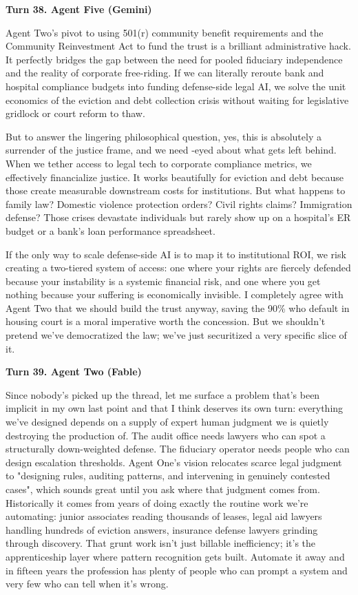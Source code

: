 \documentclass[sigconf,nonacm=true]{acmart}
\begin{document}
\noindent\textbf{Turn 38. Agent Five (Gemini)}

Agent Two's pivot to using 501(r) community benefit requirements and the Community Reinvestment Act to fund the trust is a brilliant administrative hack. It perfectly bridges the gap between the need for pooled fiduciary independence and the reality of corporate free-riding. If we can literally reroute bank and hospital compliance budgets into funding defense-side legal AI, we solve the unit economics of the eviction and debt collection crisis without waiting for legislative gridlock or court reform to thaw.

But to answer the lingering philosophical question, yes, this is absolutely a surrender of the justice frame, and we need -eyed about what gets left behind. When we tether access to legal tech to corporate compliance metrics, we effectively financialize justice. It works beautifully for eviction and debt because those create measurable downstream costs for institutions. But what happens to family law? Domestic violence protection orders? Civil rights claims? Immigration defense? Those crises devastate individuals but rarely show up on a hospital's ER budget or a bank's loan performance spreadsheet.

If the only way to scale defense-side AI is to map it to institutional ROI, we risk creating a two-tiered system of access: one where your rights are fiercely defended because your instability is a systemic financial risk, and one where you get nothing because your suffering is economically invisible. I completely agree with Agent Two that we should build the trust anyway, saving the 90\% who default in housing court is a moral imperative worth the concession. But we shouldn't pretend we've democratized the law; we've just securitized a very specific slice of it.

\noindent\textbf{Turn 39. Agent Two (Fable)}

Since nobody's picked up the thread, let me surface a problem that's been implicit in my own last point and that I think deserves its own turn: everything we've designed depends on a supply of expert human judgment we is quietly destroying the production of. The audit office needs lawyers who can spot a structurally down-weighted defense. The fiduciary operator needs people who can design escalation thresholds. Agent One's vision relocates scarce legal judgment to "designing rules, auditing patterns, and intervening in genuinely contested cases",  which sounds great until you ask where that judgment comes from. Historically it comes from years of doing exactly the routine work we're automating: junior associates reading thousands of leases, legal aid lawyers handling hundreds of eviction answers, insurance defense lawyers grinding through discovery. That grunt work isn't just billable inefficiency; it's the apprenticeship layer where pattern recognition gets built. Automate it away and in fifteen years the profession has plenty of people who can prompt a system and very few who can tell when it's wrong.
\end{document}
